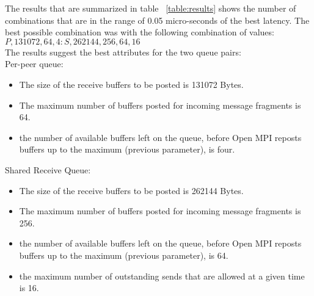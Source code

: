 The results that are summarized in table ~\ref{table:results} shows the number
of combinations that are in the range of 0.05 micro-seconds of the best
latency. The best possible combination was with the following combination of values:
$P,131072,64,4:S,262144,256,64,16$\\
The results suggest the best attributes for the two queue pairs:\\
Per-peer queue:
\begin{itemize}
\item The size of the receive buffers to be posted is 131072 Bytes.
\item The maximum number of buffers posted for incoming message fragments is
  64.
\item the number of available buffers left on the queue, before Open MPI
  reposts buffers up to the maximum (previous parameter), is four.
\end{itemize}
Shared Receive Queue:
\begin{itemize}
\item The size of the receive buffers to be posted is 262144 Bytes.
\item The maximum number of buffers posted for incoming message fragments is
  256.
\item the number of available buffers left on the queue, before Open MPI
  reposts buffers up to the maximum (previous parameter), is 64.
\item the maximum number of outstanding sends that are allowed at a given time
  is 16.
\end{itemize}

